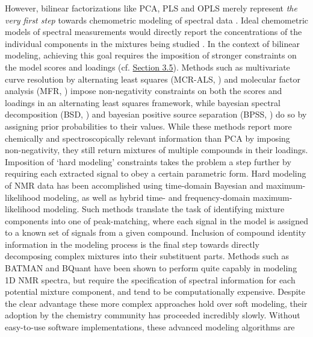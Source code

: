 \begin{doublespace}
However, bilinear factorizations like PCA, PLS and OPLS merely represent
\emph{the very first step} towards chemometric modeling of spectral data
\cite{gromski:aca2015}. Ideal chemometric models of spectral measurements
would directly report the concentrations of the individual components in
the mixtures being studied \cite{eads:anchem2004}. In the context of bilinear
modeling, achieving this goal requires the imposition of stronger constraints
on the model scores and loadings (cf. \hyperlink{section.3.5}{Section 3.5}).
Methods such as multivariate curve resolution by alternating least squares
(MCR-ALS, \cite{dejuan:crac2006}) and molecular factor analysis
(MFR, \cite{eads:anchem2004}) impose non-negativity constraints on both
the scores and loadings in an alternating least squares framework, while
bayesian spectral decomposition (BSD, \cite{ochs:jmr1999,stoyanova:anchem2004})
and bayesian positive source separation (BPSS, \cite{moussaoui:ieee2006,
  moussaoui:cils2006}) do so by assigning prior
probabilities to their values. While these methods report more chemically
and spectroscopically relevant information than PCA by imposing non-negativity,
they still return mixtures of multiple compounds in their loadings. Imposition
of `hard modeling' constraints takes the problem a step further by requiring
each extracted signal to obey a certain parametric form. Hard modeling of NMR
data has been accomplished using time-domain Bayesian
\cite{bretthorst:jmr1990a,bretthorst:jmr1990b,bretthorst:jmr1990c,
      chylla:jbnmr1993} and maximum-likelihood \cite{chylla:jbnmr1995}
modeling, as well as hybrid time- and frequency-domain maximum-likelihood
\cite{chylla:jbnmr1998,chylla:anchem2011,hu:anchem2011} modeling. Such
methods translate the task of identifying mixture components into one of
peak-matching, where each signal in the model is assigned to a known set
of signals from a given compound. Inclusion of compound identity information
in the modeling process is the final step towards directly decomposing complex
mixtures into their substituent parts. Methods such as BATMAN
\cite{astle:jasa2012,hao:binf2012} and BQuant \cite{zheng:binf2011} have
been shown to perform quite capably in modeling 1D \hnmr{} NMR spectra, but
require the specification of spectral information for each potential mixture
component, and tend to be computationally expensive. Despite the clear
advantage these more complex approaches hold over soft modeling, their
adoption by the chemistry community has proceeded incredibly slowly. Without
easy-to-use software implementations, these advanced modeling algorithms are

\end{doublespace}
